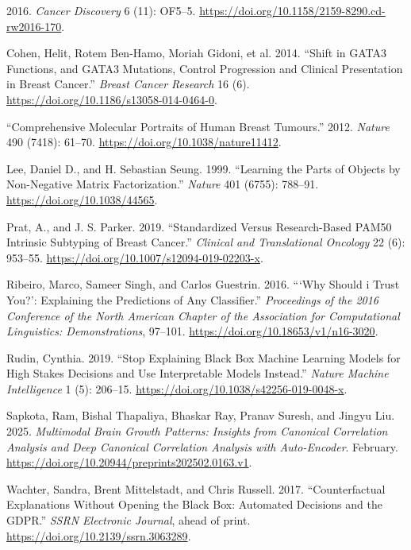 \documentclass[
  letterpaper,
]{report}
\newlength{\cslhangindent}
\newenvironment{CSLReferences}[2] %
 {\begin{list}{}{%
  \setlength{\itemindent}{0pt}
  \setlength{\leftmargin}{0pt}
  \setlength{\parsep}{0pt}
  \ifodd #1
   \setlength{\leftmargin}{\cslhangindent}
   \setlength{\itemindent}{-1\cslhangindent}
  \fi
  \setlength{\itemsep}{#2\baselineskip}}}
 {\end{list}}
\begin{document}
\protect{}\label{refs}
\begin{CSLReferences}{1}{1}
2016. \emph{Cancer Discovery} 6 (11): OF5--5.
\url{https://doi.org/10.1158/2159-8290.cd-rw2016-170}.

Cohen, Helit, Rotem Ben-Hamo, Moriah Gidoni, et al. 2014. {``Shift in
GATA3 Functions, and GATA3 Mutations, Control Progression and Clinical
Presentation in Breast Cancer.''} \emph{Breast Cancer Research} 16 (6).
\url{https://doi.org/10.1186/s13058-014-0464-0}.

{``Comprehensive Molecular Portraits of Human Breast Tumours.''} 2012.
\emph{Nature} 490 (7418): 61--70.
\url{https://doi.org/10.1038/nature11412}.

Lee, Daniel D., and H. Sebastian Seung. 1999. {``Learning the Parts of
Objects by Non-Negative Matrix Factorization.''} \emph{Nature} 401
(6755): 788--91. \url{https://doi.org/10.1038/44565}.

Prat, A., and J. S. Parker. 2019. {``Standardized Versus Research-Based
PAM50 Intrinsic Subtyping of Breast Cancer.''} \emph{Clinical and
Translational Oncology} 22 (6): 953--55.
\url{https://doi.org/10.1007/s12094-019-02203-x}.

Ribeiro, Marco, Sameer Singh, and Carlos Guestrin. 2016. {``{`Why Should
i Trust You?'}: Explaining the Predictions of Any Classifier.''}
\emph{Proceedings of the 2016 Conference of the North American Chapter
of the Association for Computational Linguistics: Demonstrations},
97--101. \url{https://doi.org/10.18653/v1/n16-3020}.

Rudin, Cynthia. 2019. {``Stop Explaining Black Box Machine Learning
Models for High Stakes Decisions and Use Interpretable Models
Instead.''} \emph{Nature Machine Intelligence} 1 (5): 206--15.
\url{https://doi.org/10.1038/s42256-019-0048-x}.

Sapkota, Ram, Bishal Thapaliya, Bhaskar Ray, Pranav Suresh, and Jingyu
Liu. 2025. \emph{Multimodal Brain Growth Patterns: Insights from
Canonical Correlation Analysis and Deep Canonical Correlation Analysis
with Auto-Encoder}. February.
\url{https://doi.org/10.20944/preprints202502.0163.v1}.

Wachter, Sandra, Brent Mittelstadt, and Chris Russell. 2017.
{``Counterfactual Explanations Without Opening the Black Box: Automated
Decisions and the GDPR.''} \emph{SSRN Electronic Journal}, ahead of
print. \url{https://doi.org/10.2139/ssrn.3063289}.


\end{CSLReferences}
\end{document}

